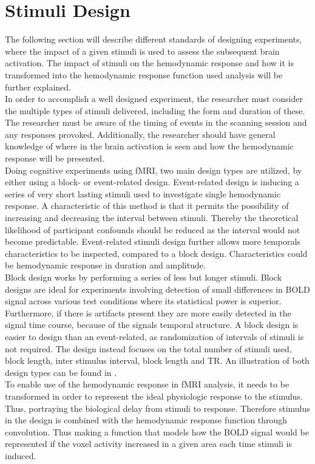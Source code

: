 \section{Stimuli Design} \label{sec:Stim}

The following section will describe different standards of designing experiments, where the impact of a given stimuli is used to assess the subsequent brain activation. The impact of stimuli on the hemodynamic response and how it is transformed into the hemodynamic response function used analysis will be further explained. \\
In order to accomplish a well designed experiment, the researcher must consider the multiple types of stimuli delivered, including the form and duration of these. The researcher must be aware of the timing of events in the scanning session and any responses provoked. Additionally, the researcher should have general knowledge of where in the brain activation is seen and how the hemodynamic response will be presented. \cite{Moayedi2018} \\
Doing cognitive experiments using fMRI, two main design types are utilized, by either using a block- or event-related design. Event-related design is inducing a series of very short lasting stimuli used to investigate single hemodynamic response. A characteristic of this method is that it permits the possibility of increasing and decreasing the interval between stimuli. Thereby the theoretical likelihood of participant confounds should be reduced as the interval would not become predictable. Event-related stimuli design further allows more temporals characteristics to be inspected, compared to a block design. Characteristics could be hemodynamic response in duration and amplitude. \cite{Chee2003}  \\
Block design works by performing a series of less but longer stimuli. Block designs are ideal for experiments involving detection of small differences in BOLD signal across various test conditions where its statistical power is superior. Furthermore, if there is artifacts present they are more easily detected in the signal time course, because of the signals temporal structure. A block design is easier to design than an event-related, as randomization of intervals of stimuli is not required. The design instead focuses on the total number of stimuli used, block length, inter stimulus interval, block length and TR. An illustration of both design types can be found in . \cite{Chee2003}  \\     
To enable use of the hemodynamic response in fMRI analysis, it needs to be transformed in order to represent the ideal physiologic response to the stimulus. Thus, portraying the biological delay from stimuli to response. Therefore stimulus in the design is combined with the hemodynamic response function through convolution. Thus making a function that models how the BOLD signal would be represented if the voxel activity increased in a given area each time stimuli is induced. \cite{Moayedi2018}


